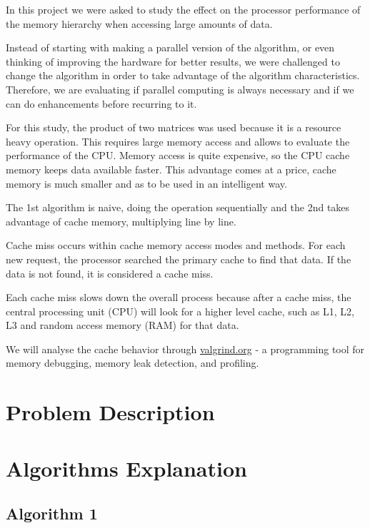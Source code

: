 \documentclass[a4paper]{article}
\begin{document}
In this project we were asked to study the effect on the processor performance of the memory hierarchy when accessing large amounts of data.\par

Instead of starting with making a parallel version of the algorithm, or even thinking of improving the hardware for better results, we were challenged to change the algorithm in order to take advantage of the algorithm characteristics. Therefore, we are evaluating if parallel computing is always necessary and if we can do enhancements before recurring to it.\par

For this study, the product of two matrices was used because it is a resource heavy operation. This requires large memory access and allows to evaluate the performance of the CPU. Memory access is quite expensive, so the CPU cache memory keeps data available faster. This advantage comes at a price, cache memory is much smaller and as to be used in an intelligent way.\par

The 1st algorithm is naive, doing the operation sequentially and the 2nd takes advantage of cache memory, multiplying line by line.\par

Cache miss occurs within cache memory access modes and methods. For each new request, the processor searched the primary cache to find that data. If the data is not found, it is considered a cache miss.\par

Each cache miss slows down the overall process because after a cache miss, the central processing unit (CPU) will look for a higher level cache, such as L1, L2, L3 and random access memory (RAM) for that data.\par

We will analyse the cache behavior through \href{Valgrind}{valgrind.org} - a programming tool for memory debugging, memory leak detection, and profiling.

\section{Problem Description}

\section{Algorithms Explanation}

\subsection{Algorithm 1}
\end{document}
